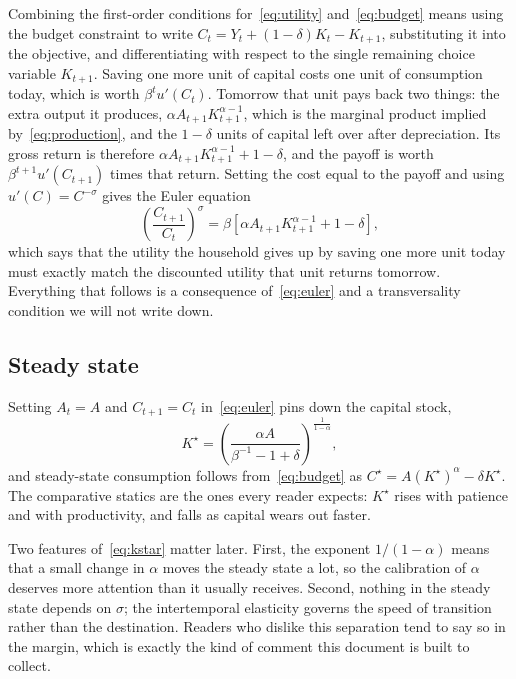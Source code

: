 Combining the first-order conditions for~\eqref{eq:utility} and~\eqref{eq:budget}
means using the budget constraint to write
$C_{t} = Y_{t} + (1 - \delta) K_{t} - K_{t+1}$, substituting it into the
objective, and differentiating with respect to the single remaining choice
variable $K_{t+1}$. Saving one more unit of capital costs one unit of consumption
today, which is worth $\beta^{t} u'(C_{t})$. Tomorrow that unit pays back two
things: the extra output it produces, $\alpha A_{t+1} K_{t+1}^{\alpha - 1}$,
which is the marginal product implied by~\eqref{eq:production}, and the
$1 - \delta$ units of capital left over after depreciation. Its gross return is
therefore $\alpha A_{t+1} K_{t+1}^{\alpha - 1} + 1 - \delta$, and the payoff is
worth $\beta^{t+1} u'(C_{t+1})$ times that return. Setting the cost equal to the
payoff and using $u'(C) = C^{-\sigma}$ gives the Euler equation
\begin{equation}
  \left( \frac{C_{t+1}}{C_{t}} \right)^{\sigma}
    = \beta \left[ \alpha A_{t+1} K_{t+1}^{\alpha - 1} + 1 - \delta \right],
  \label{eq:euler}
\end{equation}
which says that the utility the household gives up by saving one more unit
today must exactly match the discounted utility that unit returns tomorrow.
Everything that follows is a consequence of~\eqref{eq:euler} and a
transversality condition we will not write down.

\subsection{Steady state}

Setting $A_{t} = A$ and $C_{t+1} = C_{t}$ in~\eqref{eq:euler} pins down the
capital stock,
\begin{equation}
  K^{\star}
    = \left( \frac{\alpha A}{\beta^{-1} - 1 + \delta} \right)^{\frac{1}{1 - \alpha}},
  \label{eq:kstar}
\end{equation}
and steady-state consumption follows from~\eqref{eq:budget} as
$C^{\star} = A (K^{\star})^{\alpha} - \delta K^{\star}$. The comparative statics
are the ones every reader expects: $K^{\star}$ rises with patience and with
productivity, and falls as capital wears out faster.

Two features of~\eqref{eq:kstar} matter later. First, the exponent
$1 / (1 - \alpha)$ means that a small change in $\alpha$ moves the steady state a
lot, so the calibration of $\alpha$ deserves more attention than it usually
receives. Second, nothing in the steady state depends on $\sigma$; the
intertemporal elasticity governs the speed of transition rather than the
destination. Readers who dislike this separation tend to say so in the margin,
which is exactly the kind of comment this document is built to collect.

